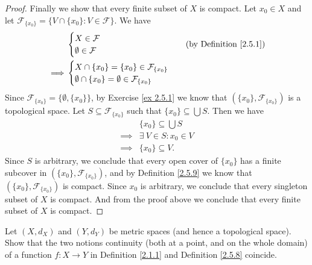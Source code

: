 \begin{proof}
    Finally we show that every finite subset of \(X\) is compact.
    Let \(x_0 \in X\) and let \(\mathcal{F}_{\{x_0\}} = \big\{V \cap \{x_0\} : V \in \mathcal{F}\big\}\).
    We have
    \begin{align*}
                 & \begin{cases}
                       X \in \mathcal{F} \\
                       \emptyset \in \mathcal{F}
                   \end{cases}                                    & \text{(by Definition \ref{2.5.1})} \\
        \implies & \begin{cases}
                       X \cap \{x_0\} = \{x_0\} \in \mathcal{F}_{\{x_0\}} \\
                       \emptyset \cap \{x_0\} = \emptyset \in \mathcal{F}_{\{x_0\}}
                   \end{cases}
    \end{align*}
    Since \(\mathcal{F}_{\{x_0\}} = \big\{\emptyset, \{x_0\}\big\}\), by Exercise \ref{ex 2.5.1} we know that \((\{x_0\}, \mathcal{F}_{\{x_0\}})\) is a topological space.
    Let \(S \subseteq \mathcal{F}_{\{x_0\}}\) such that \(\{x_0\} \subseteq \bigcup S\).
    Then we have
    \begin{align*}
                 & \{x_0\} \subseteq \bigcup S  \\
        \implies & \exists\ V \in S : x_0 \in V \\
        \implies & \{x_0\} \subseteq V.
    \end{align*}
    Since \(S\) is arbitrary, we conclude that every open cover of \(\{x_0\}\) has a finite subcover in \((\{x_0\}, \mathcal{F}_{\{x_0\}})\), and by Definition \ref{2.5.9} we know that \((\{x_0\}, \mathcal{F}_{\{x_0\}})\) is compact.
    Since \(x_0\) is arbitrary, we conclude that every singleton subset of \(X\) is compact.
    And from the proof above we conclude that every finite subset of \(X\) is compact.
\end{proof}

\begin{exercise}\label{ex 2.5.15}
    Let \((X, d_X)\) and \((Y, d_Y)\) be metric spaces (and hence a topological space).
    Show that the two notions continuity (both at a point, and on the whole domain) of a function \(f : X \to Y\) in Definition \ref{2.1.1} and Definition \ref{2.5.8} coincide.
\end{exercise}

